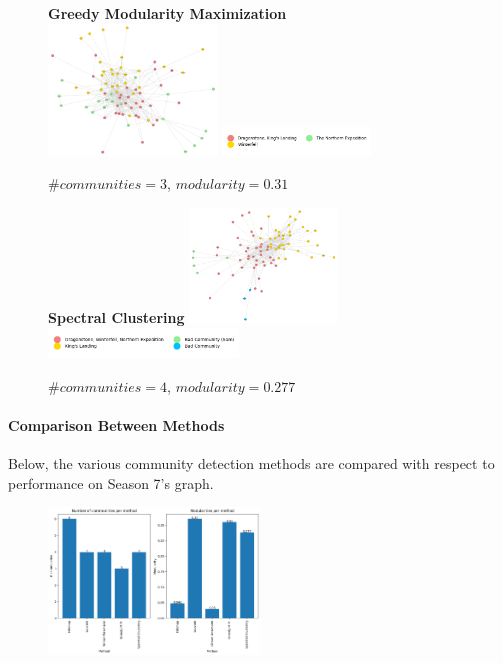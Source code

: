 \documentclass[10pt,twocolumn,letterpaper]{article}
\begin{document}
\begin{figure}[!h]
    \centering
    \textbf{Greedy Modularity Maximization}\\
    \includegraphics[width=0.4\textwidth]{img/s7/communities_gmm.jpg}
    \includegraphics[width=0.35\textwidth]{img/s7/gmm_legend.jpg}\\
    \caption{\small{$\#communities=3$, $modularity=0.31$}}
    \label{fig:gmm_s7}
\end{figure}

\begin{figure}[!h]
    \centering
    \textbf{Spectral Clustering}
    \includegraphics[width=0.35\textwidth]{img/s7/communities_sc.jpg}
    \includegraphics[width=0.45\textwidth]{img/s7/sc_legend.jpg}\\
    \caption{\small{$\#communities=4$, $modularity=0.277$}}
    \label{fig:sc_s7}
\end{figure}

\paragraph{Comparison Between Methods}

Below, the various community detection methods are compared with respect to performance on Season 7's graph.

\begin{figure}[!h]
    \centering
    \includegraphics[width=0.5\textwidth]{img/s7/communities_comparison.jpg}
\end{figure}
\end{document}
